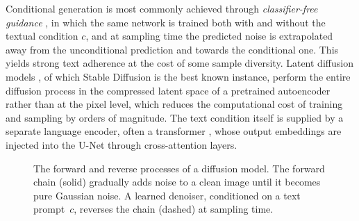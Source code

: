 Conditional generation is most commonly achieved through \emph{classifier-free guidance} \cite{ho2021cfg}, in which the same network is trained both with and without the textual condition \(c\), and at sampling time the predicted noise is extrapolated away from the unconditional prediction and towards the conditional one. This yields strong text adherence at the cost of some sample diversity. Latent diffusion models \cite{rombach2022ldm}, of which Stable Diffusion is the best known instance, perform the entire diffusion process in the compressed latent space of a pretrained autoencoder rather than at the pixel level, which reduces the computational cost of training and sampling by orders of magnitude. The text condition itself is supplied by a separate language encoder, often a transformer \cite{vaswani2017attention}, whose output embeddings are injected into the U-Net through cross-attention layers.

\begin{figure}[ht]
\centering
\caption{The forward and reverse processes of a diffusion model. The forward chain (solid) gradually adds noise to a clean image until it becomes pure Gaussian noise. A learned denoiser, conditioned on a text prompt~\(c\), reverses the chain (dashed) at sampling time.}
\label{fig:diffusion}
\end{figure}

